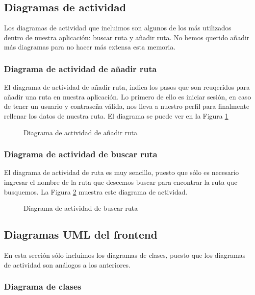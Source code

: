 \documentclass[11pt,a4paper]{article}
\begin{document}
\subsection{Diagramas de actividad}

Los diagramas de actividad que incluimos son algunos de los más utilizados dentro de nuestra aplicación: buscar ruta y añadir ruta. No hemos querido añadir más diagramas para no hacer más extensa esta memoria.


\subsubsection{Diagrama de actividad de añadir ruta}

El diagrama de actividad de añadir ruta, indica los pasos que son reuqeridos para añadir una ruta en nuestra aplicación. Lo primero de ello es iniciar sesión, en caso de tener un usuario y contraseña válida, nos lleva a nuestro perfil para finalmente rellenar los datos de nuestra ruta. El diagrama se puede ver en la Figura \ref{fig:anadirruta}

\begin{figure}[htbp]
\centering
\anadirruta
\caption{Diagrama de actividad de añadir ruta}
\label{fig:anadirruta}
\end{figure}


\subsubsection{Diagrama de actividad de buscar ruta}

El diagrama de actividad de ruta es muy sencillo, puesto que sólo es necesario ingresar el nombre de la ruta que deseemos buscar para encontrar la ruta que busquemos. La Figura \ref{fig:buscarruta} muestra este diagrama de actividad.  

\begin{figure}
\centering
\buscarruta
\caption{Diagrama de actividad de buscar ruta}
\label{fig:buscarruta}
\end{figure}

\subsection{Diagramas UML del frontend}

En esta sección sólo incluimos los diagramas de clases, puesto que los diagramas de actividad son análogos a los anteriores.

\subsubsection{Diagrama de clases}
\end{document}
